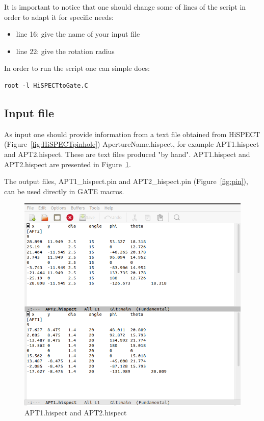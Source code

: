\documentclass[12pt]{article}
\begin{document}
It is important to notice that one should change some of lines of the script in order to adapt it for specific needs:
\begin{itemize}
\item line 16: give the name of your input file
\item line 22: give the rotation radius
\end{itemize}

In order to run the script one can simple does:   
\begin{verbatim}
root -l HiSPECTtoGate.C
\end{verbatim}

\subsection{Input file}
As input one should provide information from a text file obtained from HiSPECT (Figure~\ref{fig:HiSPECTpinhole}) ApertureName.hispect, for example APT1.hispect and APT2.hispect. These are text files produced "by hand". APT1.hispect and APT2.hispect are presented in Figure~\ref{fig:hispect}. 

The output files, APT1\_hispect.pin and APT2\_hispect.pin (Figure~\ref{fig:pin}), can be used directly in GATE macros.

\begin{figure}[htp]
\centering
\includegraphics[scale=0.45]{figs/hispect.png}
\caption{APT1.hispect and APT2.hispect}
\label{fig:hispect}
\end{figure}
\end{document}

